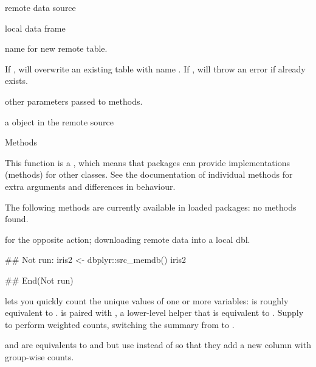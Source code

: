 \documentclass[a4paper]{book}
\begin{document}
\begin{Arguments}
\begin{ldescription}
\item[\code{dest}] remote data source

\item[\code{df}] local data frame

\item[\code{name}] name for new remote table.

\item[\code{overwrite}] If , will overwrite an existing table with
name . If , will throw an error if  already
exists.

\item[\code{...}] other parameters passed to methods.
\end{ldescription}
\end{Arguments}
%
\begin{Value}
a  object in the remote source
\end{Value}
%
\begin{Section}{Methods}

This function is a , which means that packages can provide
implementations (methods) for other classes. See the documentation of
individual methods for extra arguments and differences in behaviour.

The following methods are currently available in loaded packages:
no methods found.
\end{Section}
%
\begin{SeeAlso}
 for the opposite action; downloading remote data into
a local dbl.
\end{SeeAlso}
%
\begin{Examples}
\begin{ExampleCode}
## Not run: 
iris2 <- dbplyr::src_memdb() %
iris2

## End(Not run)
\end{ExampleCode}
\end{Examples}
%
\begin{Description}
 lets you quickly count the unique values of one or more variables:
 is roughly equivalent to
.
 is paired with , a lower-level helper that is equivalent
to . Supply  to perform weighted counts,
switching the summary from  to .

 and  are equivalents to  and 
but use  instead of  so that they add a new column
with group-wise counts.
\end{Description}
\end{document}
